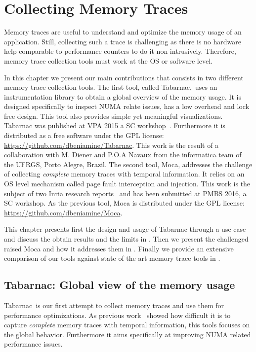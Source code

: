 \chapter{Collecting Memory Traces}

Memory traces are useful to understand and optimize the memory usage of an application.
Still, collecting such a trace is challenging as there is no hardware help comparable to performance counters to do it non intrusively.
Therefore, memory trace collection tools must work at the \gls{OS} or software level.

In this chapter we present our main contributions that consists in two different memory trace collection tools.
The first tool, called \gls{Tabarnac}, uses an instrumentation library to obtain a global overview of the memory usage.
It is designed specifically to inspect \gls{NUMA} relate issues, has a low overhead and lock free design.
This tool also provides simple yet meaningful visualizations.
\gls{Tabarnac} was published at \gls{VPA} 2015 a \gls{SC} workshop~\cite{Beniamine15TABARNAC}.
Furthermore it is distributed as a free software under the \gls{GPL} license: \url{https://github.com/dbeniamine/Tabarnac}.
This work is the result of a collaboration with M. Diener and P.O.A Navaux from the informatica team of the \gls{UFRGS}, Porto Alegre, Brazil.
The second tool, \gls{Moca}, addresses the challenge of collecting \emph{complete} memory traces with temporal information.
It relies on an \gls{OS} level mechanism called page fault interception and injection.
This work is the subject of two Inria research reports~\cite{Beniamine15Memory,Beniamine16Moca} and has been submitted at \gls{PMBS} 2016, a \gls{SC} workshop.
As the previous tool, \gls{Moca} is distributed under the \gls{GPL} license: \url{https://github.com/dbeniamine/Moca}.

This chapter presents first the design and usage of \gls{Tabarnac} through a use case and discuss the obtain results and the limits in .
Then we present the challenged raised \gls{Moca} and how it addresses them in .
Finally we provide an extensive comparison of our tools against state of the art memory trace tools in .


\section{Tabarnac: Global view of the memory usage}
\label{sec:Tabarnac}

\acrfull{Tabarnac} is our first attempt to collect memory traces and use them for performance optimizations.
As previous work~\cite{Beniamine13Cartographier} showed how difficult it is to capture \emph{complete} memory traces with temporal information, this tools focuses on the global behavior.
Furthermore it aims specifically at improving \gls{NUMA} related performance issues.

